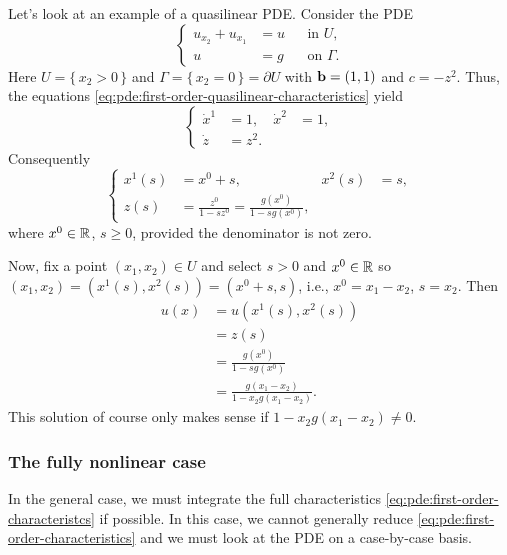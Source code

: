 \begin{example}
  Let's look at an example of a quasilinear PDE. Consider the PDE
  \[
    \tag{\(*\)}
    \left\{
      \begin{aligned}
        u_{x_2}+u_{x_1}&=u&&\text{in \(U\),}\\
        u&=g&&\text{on \(\Gamma\).}
      \end{aligned}
    \right.
  \]
  Here \(U=\{\,x_2>0\,\}\) and \(\Gamma=\{\,x_2=0\,\}=\partial U\) with
  \(\mathbf{b}=(1,1)\) and \(c=-z^2\). Thus, the equations
  \eqref{eq:pde:first-order-quasilinear-characteristics} yield
  \[
    \left\{
      \begin{aligned}
        \dot x^1&=1,&\dot x^2&=1,\\
        \dot z&=z^2.
      \end{aligned}
    \right.
  \]
  Consequently
  \[
    \left\{
      \begin{aligned}
        x^1(s)&=x^0+s,&x^2(s)&=s,\\
        z(s)&=\frac{z^0}{1-sz^0}=\frac{g(x^0)}{1-sg(x^0)},
      \end{aligned}
    \right.
  \]
  where \(x^0\in\mathbb{R}\), \(s\geq 0\), provided the denominator is not zero.

  Now, fix a point \((x_1,x_2)\in U\) and select \(s>0\) and \(x^0\in\mathbb{R}\)
  so \((x_1,x_2)=(x^1(s),x^2(s))=(x^0+s,s)\), i.e., \(x^0=x_1-x_2\),
  \(s=x_2\). Then
  \begin{align*}
    u(x)&=u(x^1(s),x^2(s))\\
        &=z(s)\\
        &=\frac{g(x^0)}{1-sg(x^0)}\\
        &=\frac{g(x_1-x_2)}{1-x_2g(x_1-x_2)}.
  \end{align*}
  This solution of course only makes sense if \(1-x_2g(x_1-x_2)\neq 0\).
\end{example}

\subsubsection{The fully nonlinear case}
In the general case, we must integrate the full characteristics
\eqref{eq:pde:first-order-characteristcs} if possible. In this case, we
cannot generally reduce \eqref{eq:pde:first-order-characteristics} and we
must look at the PDE on a case-by-case basis.

